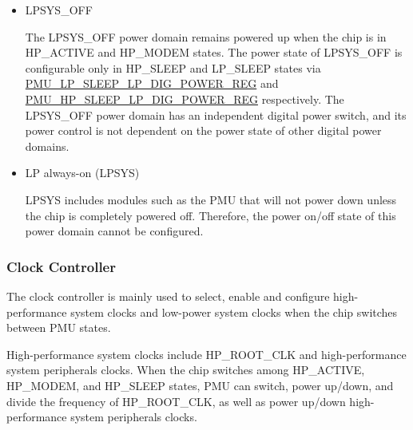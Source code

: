 \documentclass[main\_\_EN.tex]{subfiles}
\begin{document}
\begin{itemize}
\begin{itemize}
        \item In HP\_ACTIVE, HP\_SLEEP and HP\_MODEM states, the Internal SRAMx domain can be powered down or put into Deep-sleep mode. In Deep-sleep, the memory cannot be read or written to, but data can be retained. Configure \hyperref[fielddesc:PMUHPACTIVEHPMEMDSLP]{PMU\_\_HP\_MEM\_DSLP} to enable Memory Deep-sleep mode.
        \end{itemize}

    \item LPSYS\_OFF

    The LPSYS\_OFF power domain remains powered up when the chip is in HP\_ACTIVE and HP\_MODEM states. The power state of LPSYS\_OFF is configurable only in HP\_SLEEP and LP\_SLEEP states via \hyperref[regdesc:PMULPSLEEPLPDIGPOWERREG]{PMU\_LP\_SLEEP\_LP\_DIG\_POWER\_REG} and \hyperref[regdesc:PMUHPSLEEPLPDIGPOWERREG]{PMU\_HP\_SLEEP\_LP\_DIG\_POWER\_REG} respectively. The LPSYS\_OFF power domain has an independent digital power switch, and its power control is not dependent on the power state of other digital power domains.

    \item LP always-on (LPSYS)

    LPSYS includes modules such as the PMU that will not power down unless the chip is completely powered off. Therefore, the power on/off state of this power domain cannot be configured.
\end{itemize}

\subsubsection{Clock Controller}

The clock controller is mainly used to select, enable and configure high-performance system clocks and low-power system clocks when the chip switches between PMU states.

High-performance system clocks include HP\_ROOT\_CLK and high-performance system peripherals clocks. When the chip switches among HP\_ACTIVE, HP\_MODEM, and HP\_SLEEP states, PMU can switch, power up/down, and divide the frequency of HP\_ROOT\_CLK, as well as power up/down high-performance system peripherals clocks.
\end{document}
